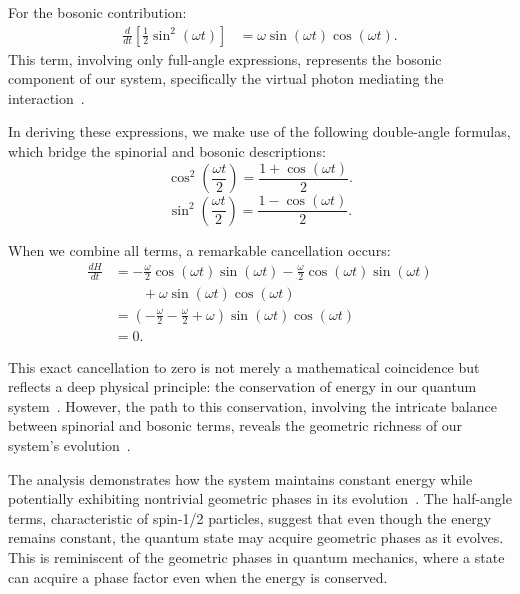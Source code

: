 \documentclass[%
 reprint,
 amsmath,amssymb,
 aps,
]{revtex4-1}
\numberwithin{equation}{section}%
\begin{document}
For the bosonic contribution:
\begin{equation}
    \begin{split}
        \frac{d}{dt}\left[\frac{1}{2}\sin^2(\omega t)\right] &= \omega\sin(\omega t)\cos(\omega t).
    \end{split}
    \label{eq:term3}
\end{equation}
This term, involving only full-angle expressions, represents the bosonic component of our system, specifically the virtual photon mediating the interaction~\cite{hanamura2018}.

In deriving these expressions, we make use of the following double-angle formulas, which bridge the spinorial and bosonic descriptions:
\begin{equation}
    \cos^2\left(\frac{\omega t}{2}\right) = \frac{1 + \cos(\omega t)}{2}.
    \label{eq:double_angle2}
\end{equation}
\begin{equation}
    \sin^2\left(\frac{\omega t}{2}\right) = \frac{1 - \cos(\omega t)}{2}.
    \label{eq:double_angle3}
\end{equation}

When we combine all terms, a remarkable cancellation occurs:
\begin{equation}
    \begin{split}
        \frac{dH}{dt} &= -\frac{\omega}{2}\cos(\omega t)\sin(\omega t) - \frac{\omega}{2}\cos(\omega t)\sin(\omega t) \\
        &\qquad + \omega\sin(\omega t)\cos(\omega t) \\
        &= \left(-\frac{\omega}{2} - \frac{\omega}{2} + \omega\right)\sin(\omega t)\cos(\omega t) \\
        &= 0.
    \end{split}
    \label{eq:final_derivative}
\end{equation}

This exact cancellation to zero is not merely a mathematical coincidence but reflects a deep physical principle: the conservation of energy in our quantum system~\cite{weinberg1995}. However, the path to this conservation, involving the intricate balance between spinorial and bosonic terms, reveals the geometric richness of our system's evolution~\cite{shapere1989}.

The analysis demonstrates how the system maintains constant energy while potentially exhibiting nontrivial geometric phases in its evolution~\cite{berry1984}. The half-angle terms, characteristic of spin-1/2 particles, suggest that even though the energy remains constant, the quantum state may acquire geometric phases as it evolves. This is reminiscent of the geometric phases in quantum mechanics, where a state can acquire a phase factor even when the energy is conserved.
\end{document}

